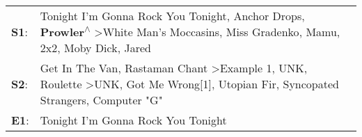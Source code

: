 \begin{supertabular}{p{0.03\textwidth}p{0.92\textwidth}}
 \textbf{S1}:  &                           Tonight I'm Gonna Rock You Tonight\textsuperscript{}, \enspace Anchor Drops\textsuperscript{}, \enspace \textbf{Prowler\textsuperscript{$\wedge$}} \textgreater \enspace White Man's Moccasins\textsuperscript{}, \enspace Miss Gradenko\textsuperscript{}, \enspace Mamu\textsuperscript{}, \enspace 2x2\textsuperscript{}, \enspace Moby Dick\textsuperscript{}, \enspace Jared\textsuperscript{}  \enspace  \\
 \textbf{S2}:  &  Get In The Van\textsuperscript{}, \enspace Rastaman Chant\textsuperscript{} \textgreater \enspace Example 1\textsuperscript{}, \enspace UNK\textsuperscript{}, \enspace Roulette\textsuperscript{} \textgreater \enspace UNK\textsuperscript{}, \enspace Got Me Wrong[1]\textsuperscript{}, \enspace Utopian Fir\textsuperscript{}, \enspace Syncopated Strangers\textsuperscript{}, \enspace Computer "G"\textsuperscript{}  \enspace  \\
 \textbf{E1}:  &                                                                                                                                                                                                                                                                                                                                                                          Tonight I'm Gonna Rock You Tonight\textsuperscript{}  \enspace  \\
\end{supertabular}
